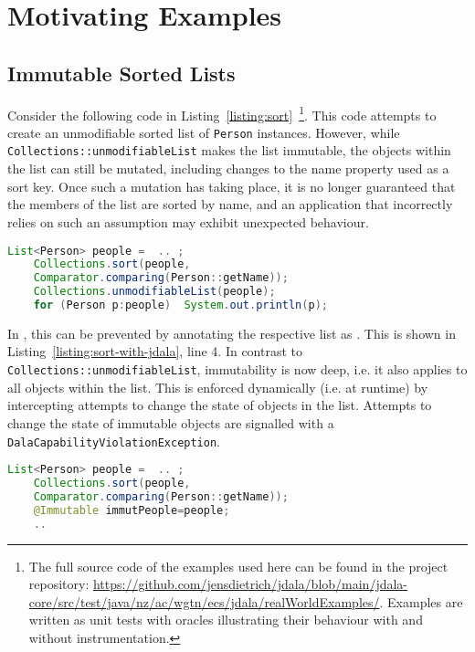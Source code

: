 \section{Motivating Examples}

\subsection{Immutable Sorted Lists}	


Consider the following code in Listing~\ref{listing:sort}~\footnote{The full source code of the examples used here can be found in the project repository: \url{https://github.com/jensdietrich/jdala/blob/main/jdala-core/src/test/java/nz/ac/wgtn/ecs/jdala/realWorldExamples/}. Examples are written as unit tests with oracles illustrating their behaviour with and without \jdala instrumentation.}. This code attempts to create an unmodifiable sorted list of \texttt{Person} instances. 
However, while \texttt{Collections::unmodifiableList} makes the list immutable, the objects within the list can still be mutated, including changes to the name property used as a sort key.  Once such a mutation 
has taking place, it is no longer guaranteed that the members of the list are sorted by name, and an application that incorrectly relies on such an assumption may exhibit unexpected behaviour.

\begin{lstlisting}[language=Java, caption=Erroneous Attempt to Make a Sorted List Immutable, label=listing:sort]
	List<Person> people =  .. ;
	Collections.sort(people,
	Comparator.comparing(Person::getName));
	Collections.unmodifiableList(people);
	for (Person p:people)  System.out.println(p);
\end{lstlisting}



In \jdala ,  this can be prevented by annotating the respective list as \Immutable. This is shown in Listing~\ref{listing:sort-with-jdala}, line 4. In contrast to \texttt{Collections::unmodifiableList}, immutability is now deep, i.e. it also applies to all objects within the list. This is enforced dynamically (i.e. at runtime) by intercepting attempts to change the state of objects in the list.  Attempts to change the state of immutable objects are signalled with a \texttt{DalaCapabilityViolationException}. 

\begin{lstlisting}[language=Java, caption=Make a Sorted List Immutable with \jdala, label=listing:sort-with-jdala]
	List<Person> people =  .. ;
	Collections.sort(people,
	Comparator.comparing(Person::getName));
	@Immutable immutPeople=people;
	..
\end{lstlisting}


